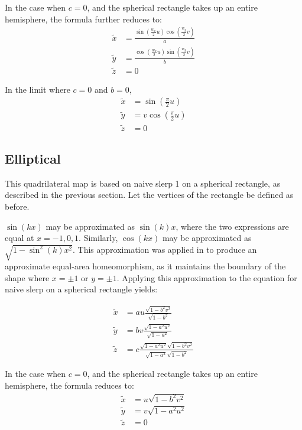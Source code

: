 \documentclass{amsart}[12pt]
\begin{document}
In the case when $c=0$,
and the spherical rectangle takes up an entire hemisphere, the formula further
reduces to:
\begin{equation}\begin{split}
  \widetilde{x} &= \frac{\sin(\frac{w_x}{2}u) \cos(\frac{w_y}{2}v) }
    {a}\\
  \widetilde{y} &= \frac{\cos(\frac{w_x}{2}u) \sin(\frac{w_y}{2}v) }
    {b}\\
  \widetilde{z} &=0
\end{split}\end{equation}

In the limit where $c=0$ and $b = 0$,
\begin{equation}\begin{split}
  \widetilde{x} &= \sin(\frac{\pi}{2}u) \\
  \widetilde{y} &= v \cos(\frac{\pi}{2}u) \\
  \widetilde{z} &= 0
\end{split}\end{equation}

\subsection{Elliptical}
This quadrilateral map is based on naive slerp 1 on a spherical rectangle, as
described in the previous section. Let the vertices of the rectangle be defined
as before.

$\sin(k x)$ may be approximated as $\sin(k)x$, where the two expressions are
equal at $x=-1,0,1$. Similarly, $\cos(k x)$ may be approximated as
$\sqrt{1 - \sin^2(k) x^2}$. This approximation was applied in \cite{reynolds} to
produce an approximate equal-area homeomorphism, as it maintains the boundary
of the shape where $x=\pm1$ or $y=\pm1$. Applying this approximation
to the equation for naive slerp on a spherical rectangle yields:

\begin{equation}\begin{split}\label{eq:elliptical}
  \widetilde{x} &= au \frac{\sqrt{1-b^2 v^2} }
    {\sqrt{1-b^2}}\\
  \widetilde{y} &= bv \frac{\sqrt{1-a^2 u^2} }
    {\sqrt{1-a^2}}\\
  \widetilde{z} &=c \frac{\sqrt{1-a^2 u^2}\sqrt{1-b^2 v^2} }
    {\sqrt{1-a^2}\sqrt{1-b^2}}
\end{split}\end{equation}

In the case when $c=0$, and the spherical rectangle takes up an entire
hemisphere, the formula reduces to:
\begin{equation}\begin{split}
  \widetilde{x} &= u \sqrt{1-b^2 v^2} \\
  \widetilde{y} &= v \sqrt{1-a^2 u^2} \\
  \widetilde{z} &= 0
\end{split}\end{equation}
\end{document}
